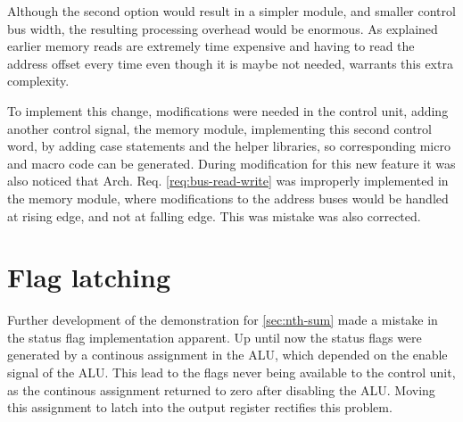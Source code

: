 Although the second option would result in a simpler module, and smaller control bus width, the resulting processing overhead would be enormous. As explained earlier memory reads are extremely time expensive and having to read the address offset every time even though it is maybe not needed, warrants this extra complexity.

To implement this change, modifications were needed in the control unit, adding another control signal, the memory module, implementing this second control word, by adding case statements and the helper libraries, so corresponding micro and macro code can be generated. During modification for this new feature it was also noticed that Arch. Req. \ref{req:bus-read-write} was improperly implemented in the memory module, where modifications to the address buses would be handled at rising edge, and not at falling edge. This was mistake was also corrected.

\section{Flag latching}
Further development of the demonstration for \ref{sec:nth-sum} made a mistake in the status flag implementation apparent. Up until now the status flags were generated by a continous assignment in the ALU, which depended on the enable signal of the ALU. This lead to the flags never being available to the control unit, as the continous assignment returned to zero after disabling the ALU. Moving this assignment to latch into the output register rectifies this problem.

